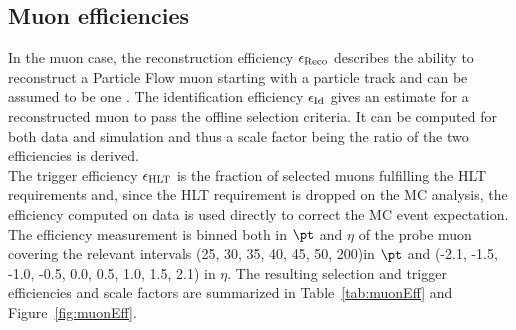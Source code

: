\subsection{Muon efficiencies}\label{subsec:EffMu}

In the muon case, the reconstruction efficiency $\epsilon_{\textnormal{Reco}}$ describes the ability to reconstruct a Particle Flow muon starting with
a particle track and can be assumed to be one \cite{MUONPAS}. The identification efficiency $\epsilon_{\textnormal{Id}}$ gives an estimate for a
reconstructed muon to pass the offline selection criteria. It can be computed for both data and simulation and thus a scale factor being
the ratio of the two efficiencies is derived. \\
The trigger efficiency $\epsilon_{\textnormal{HLT}}$  is the fraction of selected muons fulfilling the HLT requirements and, since the HLT
requirement is dropped on the MC analysis, the efficiency computed on data is used directly to correct the MC event expectation.\\
The efficiency measurement is binned both in $\pt$ and $\eta$ of the probe muon covering the
relevant intervals (25, 30, 35, 40, 45, 50, 200)\GeVc in $\pt$ and (-2.1, -1.5, -1.0, -0.5, 0.0, 0.5, 1.0, 1.5, 2.1) in $\eta$. The resulting selection
and trigger efficiencies and scale factors are summarized in Table~\ref{tab:muonEff} and Figure~\ref{fig:muonEff}.

